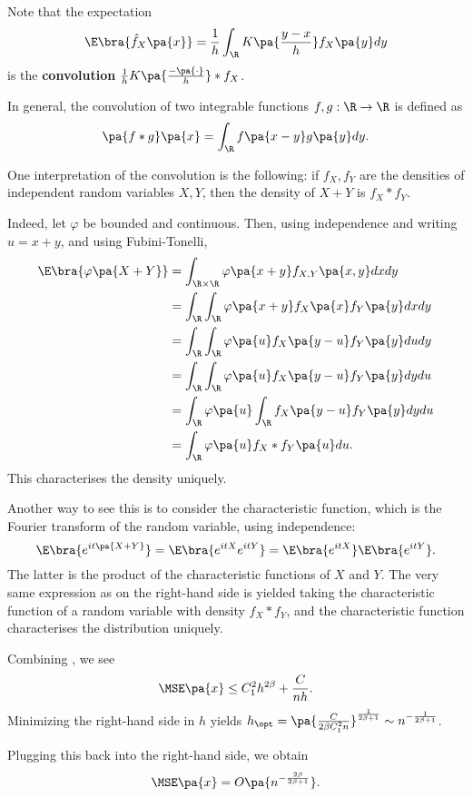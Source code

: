 \begin{remark}
Note that the expectation
  \begin{equation}
  \E\bra{\hat{f}_X\pa{x}} = \frac{1}{h}\int_\R K\pa{\frac{y-x}{h}} f_X\pa{y}dy
  \end{equation}
  is the \textbf{convolution} $\frac{1}{h} K\pa{\frac{- \pa{\cdot}}{h}}\ast f_X$.

  In general, the convolution of two integrable functions $f,g:\R\rightarrow \R$ is defined as
  \begin{equation}
  \pa{f\ast g}\pa{x} = \int_\R f\pa{x-y} g\pa{y} dy.
    \end{equation}

  One interpretation of the convolution is the following: if $f_X,f_Y$ are the densities of independent random variables $X,Y$, then the density of $X+Y$ is $f_X\ast f_Y$.

  Indeed, let $\varphi$ be bounded and continuous. Then, using independence and writing $u=x+y$, and using Fubini-Tonelli,
  \begin{equation}
  \begin{split}
    \E\bra{\varphi\pa{X+Y}}&=\int_{\R\times \R} \varphi \pa{x+y} f_{X,Y}\pa{x,y} dx dy \\
    &= \int_\R \int_\R \varphi\pa{x+y}f_X\pa{x}f_Y\pa{y} dx dy \\
    &= \int_\R \int_\R \varphi\pa{u} f_X\pa{y-u} f_Y\pa{y} du dy \\
    &= \int_\R \int_\R \varphi\pa{u} f_X\pa{y-u}f_Y\pa{y} dy du \\
    &=\int_\R \varphi\pa{u}\int_\R f_X\pa{y-u}f_Y\pa{y} dy du \\
    &=\int_\R \varphi\pa{u} f_X\ast f_Y \pa{u} du.
    \end{split}
  \end{equation}
  This characterises the density uniquely.

  Another way to see this is to consider the characteristic function, which is the Fourier transform of the random variable, using independence:
  \begin{equation}
    \E\bra{e^{it\pa{X+Y}}} = \E\bra{e^{itX}e^{itY}} = \E\bra{e^{itX}}\E\bra{e^{itY}}.
  \end{equation}
  The latter is the product of the characteristic functions of $X$ and $Y$. The very same expression as on the right-hand side is yielded taking the characteristic function of a random variable with density $f_X\ast f_Y$, and the characteristic function characterises the distribution uniquely.
\end{remark}
\begin{remark}
  Combining , we see
  \begin{equation}
    \MSE \pa{x}\leq C_1^2 h^{2\beta} + \frac{C}{nh}.
  \end{equation}
  Minimizing the right-hand side in $h$ yields $h_{\opt}= \pa{\frac{C}{2\beta C_1^2 n}}^{\frac{1}{2\beta +1}}\sim n^{-\frac{1}{2\beta +1}}$.

  Plugging this back into the right-hand side, we obtain
  \begin{equation}
    \MSE\pa{x} = O\pa{n^{-\frac{2\beta}{2\beta+1}}}.
  \end{equation}
\end{remark}
